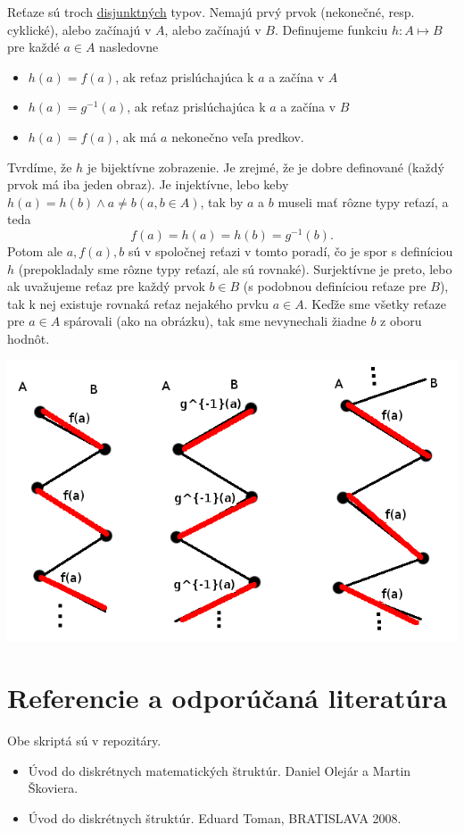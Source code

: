 \documentclass[10pt,a4paper]{article}
\begin{document}
Reťaze sú troch \underline{disjunktných} typov. Nemajú prvý prvok (nekonečné, resp. cyklické), alebo začínajú v $A$, alebo začínajú v $B$. Definujeme funkciu $h : A \mapsto B$ pre každé $a \in A$ nasledovne 
\begin{itemize}
\item $h(a) = f(a)$, ak reťaz prislúchajúca k $a$ a začína v $A$
\item $h(a) = g^{-1}(a)$, ak reťaz prislúchajúca k $a$ a začína v $B$
\item $h(a) = f(a)$, ak má $a$ nekonečno veľa predkov. 
\end{itemize}

Tvrdíme, že $h$ je bijektívne zobrazenie. Je zrejmé, že je dobre definované (každý prvok má iba jeden obraz). Je injektívne, lebo keby $h(a)=h(b) \wedge a \neq b (a,b \in A)$, tak by $a$ a $b$ museli mať rôzne typy reťazí, a teda 
$$
f(a)=h(a)=h(b)=g^{-1}(b).
$$
Potom ale $a, f(a), b$ sú v spoločnej reťazi v tomto poradí, čo je spor s definíciou $h$ (prepokladaly sme rôzne typy reťazí, ale sú rovnaké). Surjektívne je preto, lebo ak uvažujeme reťaz pre každý prvok $b \in B$ (s podobnou definíciou reťaze pre $B$), tak k nej existuje rovnaká reťaz nejakého prvku $a \in A$. Keďže sme všetky reťaze pre $a \in A$ spárovali (ako na obrázku), tak sme nevynechali žiadne $b$ z oboru hodnôt. 

\begin{center}
\includegraphics[scale=0.5]{parovanie.png}
\end{center}



\clearpage
\section*{Referencie a odporúčaná literatúra}
Obe skriptá sú v repozitáry. 

\begin{itemize}                                
\item Úvod do diskrétnych matematických štruktúr. Daniel Olejár a Martin Škoviera.
\item Úvod do diskrétnych štruktúr. Eduard Toman, BRATISLAVA 2008.
\end{itemize}
\end{document}

